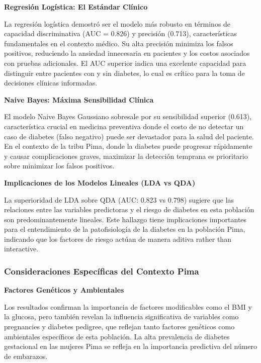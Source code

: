 \documentclass[12pt,a4paper]{article}
\begin{document}
\textbf{Regresión Logística: El Estándar Clínico}

La regresión logística demostró ser el modelo más robusto en términos de capacidad discriminativa (AUC = 0.826) y precisión (0.713), características fundamentales en el contexto médico. Su alta precisión minimiza los falsos positivos, reduciendo la ansiedad innecesaria en pacientes y los costos asociados con pruebas adicionales. El AUC superior indica una excelente capacidad para distinguir entre pacientes con y sin diabetes, lo cual es crítico para la toma de decisiones clínicas informadas.

\newpage

\textbf{Naive Bayes: Máxima Sensibilidad Clínica}

El modelo Naive Bayes Gaussiano sobresale por su sensibilidad superior (0.613), característica crucial en medicina preventiva donde el costo de no detectar un caso de diabetes (falso negativo) puede ser devastador para la salud del paciente. En el contexto de la tribu Pima, donde la diabetes puede progresar rápidamente y causar complicaciones graves, maximizar la detección temprana es prioritario sobre minimizar los falsos positivos.

\vspace{0.5cm}

\textbf{Implicaciones de los Modelos Lineales (LDA vs QDA)}

La superioridad de LDA sobre QDA (AUC: 0.823 vs 0.798) sugiere que las relaciones entre las variables predictoras y el riesgo de diabetes en esta población son predominantemente lineales. Este hallazgo tiene implicaciones importantes para el entendimiento de la patofisiología de la diabetes en la población Pima, indicando que los factores de riesgo actúan de manera aditiva rather than interactive.

\subsubsection{Consideraciones Específicas del Contexto Pima}

\textbf{Factores Genéticos y Ambientales}

Los resultados confirman la importancia de factores modificables como el BMI y la glucosa, pero también revelan la influencia significativa de variables como pregnancies y diabetes pedigree, que reflejan tanto factores genéticos como ambientales específicos de esta población. La alta prevalencia de diabetes gestacional en las mujeres Pima se refleja en la importancia predictiva del número de embarazos.
\end{document}
